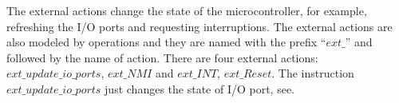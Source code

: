 \documentclass[a4paper]{llncs}
\begin{document}
%
%
%
%
%
The external actions change the state of the microcontroller, for
example, refreshing the I/O ports and requesting interruptions. The
external actions are also modeled by operations and they are named
with the prefix ``$ext\_$'' and followed by the name of action. There
are four external actions: $ext\_update\_io\_ports$, $ext\_NMI$ and
$ext\_INT$, $ext\_Reset$. The instruction $ext\_update\_io\_ports$
just changes the state of I/O port, see.\\
\end{document}
